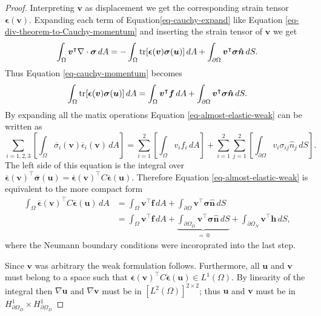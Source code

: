 \documentclass[a4paper,english]{elsarticle}%
\begin{document}
\begin{proof}
Interpreting $\boldsymbol{v}$ as displacement we get the corresponding strain tensor $\boldsymbol{\epsilon} (\boldsymbol v)$. Expanding each term of Equation\eqref{eq-cauchy-expand} like Equation \eqref{eq-div-theorem-to-Cauchy-momentum} and inserting the strain tensor of $\boldsymbol{v}$ we get
\begin{equation}\label{eq-elastic-weak-left}
    \int_\Omega{\boldsymbol{v}^\intercal \nabla \cdot \boldsymbol{\sigma}} \,dA = -\int_\Omega{\tr[ \boldsymbol{\epsilon}(\boldsymbol v)\boldsymbol{\sigma}(\boldsymbol u)]} \,dA + \int_{\partial \Omega}{\boldsymbol{v}^\intercal \boldsymbol{\sigma}}\boldsymbol{\hat{n} } \,dS.
\end{equation}
Thus Equation \eqref{eq-cauchy-momentum} becomes
\begin{equation} \label{eq-almost-elastic-weak}
    \int_\Omega{\tr[ \boldsymbol{\epsilon}(\boldsymbol v)\boldsymbol{\sigma}(\boldsymbol u)]} \,dA  = \int_\Omega{\boldsymbol{v}^\intercal    \boldsymbol{f}} \,dA + \int_{\partial \Omega}{\boldsymbol{v}^\intercal \boldsymbol{\sigma}}\boldsymbol{\hat{n} } \,dS.
\end{equation}
By expanding all the matix operations Equation \eqref{eq-almost-elastic-weak} can be written as 
\begin{equation}
    \sum_{i = 1,2,3} \left[\int_\Omega{ \overline{\sigma}_i(\boldsymbol v) \overline{\epsilon}_i(\boldsymbol v)}   \,dA \right] = \sum_{i = 1}^2 \left[\int_\Omega{ v_i f_i}   \,dA \right] + \sum_{i = 1}^{2}{{\sum_{j = 1}^{2} \left[\int_{\partial \Omega}{ v_i \sigma_{ij} \hat{n}_j}   \,dS \right]}}. 
\end{equation}
The left side of this equation is the integral over $\boldsymbol{\overline \epsilon}(\boldsymbol v)^\intercal \boldsymbol{\overline \sigma}(\boldsymbol u) = \boldsymbol{\overline \epsilon}(\boldsymbol v)^\intercal C\boldsymbol{\overline \epsilon}(\boldsymbol u)$. Therefore Equation \eqref{eq-almost-elastic-weak} is equivalent to the more compact form
\begin{align}
    \int_\Omega{ \boldsymbol{\overline \epsilon}(\boldsymbol v)^\intercal C\boldsymbol{\overline \epsilon}(\boldsymbol u)} \,dA  &=\int_\Omega{\boldsymbol{v}^\intercal \boldsymbol{f}} \,dA + \int_{\partial \Omega}{\boldsymbol{v}^\intercal \boldsymbol{\sigma}}\boldsymbol{\hat{n} } \,dS  \\
    &= \int_\Omega{\boldsymbol{v}^\intercal \boldsymbol{f}} \,dA + \underbrace{\int_{\partial \Omega_D}{\boldsymbol{v}^\intercal \boldsymbol{\sigma}}\boldsymbol{\hat{n} } \,dS}_{= \ 0} + \int_{\partial \Omega_N}{\boldsymbol{v}^\intercal \boldsymbol h} \,dS,
\end{align}
where the Neumann boundary conditions were incoroprated into the last step.

Since $\bm v$ was arbitrary the weak formulation follows. Furthermore, all $\bm u$ and $\bm v$ must belong to a space such that $\boldsymbol{\overline \epsilon}(\boldsymbol v)^\intercal C\boldsymbol{\overline \epsilon}(\boldsymbol u) \in {L^1}(\Omega)$. By linearity of the integral then $\nabla \bm u$ and $\nabla \bm v$ must be in $\left[{L^2}(\Omega)\right]^{2 \times 2}$; thus $\bm u$ and $\bm v$ must be in $ H^1_{\partial \Omega_D } \times H^1_{\partial \Omega_D } $
\end{proof}
\end{document}
